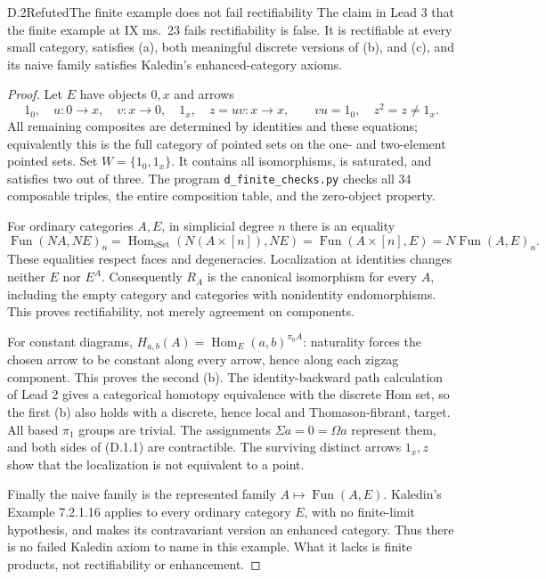 \begin{result}{D.2}{Refuted}{The finite example does not fail rectifiability}
The claim in Lead 3 that the finite example at IX ms.~23 fails
rectifiability is false. It is rectifiable at every small category,
satisfies (a), both meaningful discrete versions of (b), and (c), and
its naive family satisfies Kaledin's enhanced-category axioms.
\end{result}
\begin{proof}
Let $E$ have objects $0,x$ and arrows
\[
 1_0,\quad u:0\to x,\quad v:x\to0,\quad1_x,\quad z=uv:x\to x,
 \qquad vu=1_0,\quad z^2=z\ne1_x.
\]
All remaining composites are determined by identities and these
equations; equivalently this is the full category of pointed sets on
the one- and two-element pointed sets. Set $W=\{1_0,1_x\}$.
It contains all isomorphisms, is saturated, and satisfies two out of
three. The program \texttt{d\_finite\_checks.py} checks all 34 composable
triples, the entire composition table, and the zero-object property.

For ordinary categories $A,E$, in simplicial degree $n$ there is an
equality
\[
 \operatorname{Fun}(NA,NE)_n
 =\operatorname{Hom}_{\mathrm{sSet}}(N(A\times[n]),NE)
 =\operatorname{Fun}(A\times[n],E)
 =N\operatorname{Fun}(A,E)_n.
\]
These equalities respect faces and degeneracies. Localization at
identities changes neither $E$ nor $E^A$. Consequently $R_A$ is the
canonical isomorphism for every $A$, including the empty category and
categories with nonidentity endomorphisms. This proves rectifiability,
not merely agreement on components.

For constant diagrams,
$H_{a,b}(A)=\operatorname{Hom}_E(a,b)^{\pi_0 A}$: naturality forces the
chosen arrow to be constant along every arrow, hence along each zigzag
component. This proves the second (b). The identity-backward path
calculation of Lead 2 gives a categorical homotopy equivalence with the
discrete Hom set, so the first (b) also holds with a discrete, hence local
and Thomason-fibrant, target. All based $\pi_1$ groups are trivial.
The assignments $\Sigma a=0=\Omega a$ represent them, and both sides
of (D.1.1) are contractible. The surviving distinct arrows $1_x,z$
show that the localization is not equivalent to a point.

Finally the naive family is the represented family
$A\mapsto\operatorname{Fun}(A,E)$. Kaledin's Example 7.2.1.16 applies
to every ordinary category $E$, with no finite-limit hypothesis, and
makes its contravariant version an enhanced category. Thus there is
no failed Kaledin axiom to name in this example. What it lacks is
finite products, not rectifiability or enhancement.
\end{proof}

